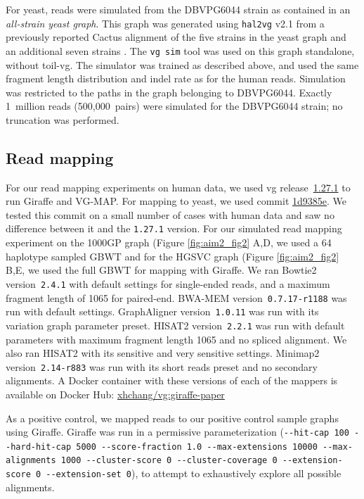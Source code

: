 \documentclass[11pt]{ucscthesis}
\newcommand{\vgcommit}[2]{\href{https://github.com/vgteam/vg/commit/#1}{#2}}
\newcommand{\vocab}[1]{\emph{#1}}
\begin{document}
For yeast, reads were simulated from the DBVPG6044 strain as contained in an \vocab{all-strain yeast graph}. 
This graph was generated using \texttt{hal2vg} v2.1 from a previously reported Cactus alignment of the five strains in the yeast graph and an additional seven strains \cite{hickey_vgsv_2020}.
The \texttt{vg~sim} tool was used on this graph standalone, without toil-vg.
The simulator was trained as described above, and used the same fragment length distribution and indel rate as for the human reads.
Simulation was restricted to the paths in the graph belonging to DBVPG6044.
Exactly 1~million reads (500,000~pairs) were simulated for the DBVPG6044 strain; no truncation was performed.


\subsection{Read mapping}
\label{subsec:aim2:readmapping}
For our read mapping experiments on human data, we used vg release~\vgcommit{6b7d2eeb618bb85c65438016a9eeccecfa0f6c82}{1.27.1} to run Giraffe and VG-MAP.
For mapping to yeast, we used commit \vgcommit{1d9385e1ca55689cd3ad251b6b2c23319d37be52}{1d9385e}.
We tested this commit on a small number of cases with human data and saw no difference between it and the \texttt{1.27.1} version.
For our simulated read mapping experiment on the 1000GP graph (Figure \ref{fig:aim2_fig2} A,D, we used a 64 haplotype sampled GBWT and for the HGSVC graph (Figure \ref{fig:aim2_fig2} B,E, we used the full GBWT for mapping with Giraffe.
We ran Bowtie2 version~\texttt{2.4.1} with default settings for single-ended reads, and a maximum fragment length of 1065 for paired-end.
BWA-MEM version~\texttt{0.7.17-r1188} was run with default settings.
GraphAligner version~\texttt{1.0.11} was run with its variation graph parameter preset.
HISAT2 version~\texttt{2.2.1} was run with default parameters with maximum fragment length 1065 and no spliced alignment.
We also ran HISAT2 with its sensitive and very sensitive settings.
Minimap2 version~\texttt{2.14-r883} was run with its short reads preset and no secondary alignments.
A Docker container with these versions of each of the mappers is available on Docker Hub: \href{https://hub.docker.com/layers/xhchang/vg/giraffe-paper/images/sha256-7dd5579b6cd3805c7d335803f2f646eada09f32159d1c534ab6c91c402627e33?context=explore}{xhchang/vg:giraffe-paper}

As a positive control, we mapped reads to our positive control sample graphs using Giraffe.
Giraffe was run in a permissive parameterization (\texttt{-{}-hit-cap 100 -{}-hard-hit-cap 5000 -{}-score-fraction 1.0 -{}-max-extensions 10000 -{}-max-alignments 1000 -{}-cluster-score 0 -{}-cluster-coverage 0 -{}-extension-score 0 -{}-extension-set 0}), to attempt to exhaustively explore all possible alignments.
\end{document}
